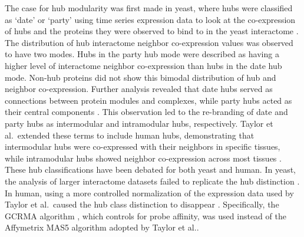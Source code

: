 The case for hub modularity was first made in yeast, where hubs were
classified as `date' or `party' using time series expression data to
look at the co-expression of hubs and the proteins they were observed
to bind to in the yeast interactome \cite{han04}. The distribution of
hub interactome neighbor co-expression values was observed to have two
modes. Hubs in the party hub mode were described as having a higher
level of interactome neighbor co-expression than hubs in the date hub
mode. Non-hub proteins did not show this bimodal distribution of hub
and neighbor co-expression. Further analysis revealed that date hubs
served as connections between protein modules and complexes, while
party hubs acted as their central components \cite{fraser05}. This
observation led to the re-branding of date and party hubs as
intermodular and intramodular hubs, respectively. Taylor et
al.\ extended these terms to include human hubs, demonstrating that
intermodular hubs were co-expressed with their neighbors in specific
tissues, while intramodular hubs showed neighbor co-expression across
most tissues \cite{taylor09}. These hub classifications have been
debated for both yeast and human. In yeast, the analysis of larger
interactome datasets failed to replicate the hub distinction
\cite{batada06,batada07}. In human, using a more controlled
normalization of the expression data used by Taylor et al.\ caused the
hub class distinction to disappear \cite{agarwal09}. Specifically, the
GCRMA algorithm \cite{wu2004model}, which controls for probe affinity,
was used instead of the Affymetrix MAS5 algorithm
\cite{hubbell2002robust} adopted by Taylor et al..

